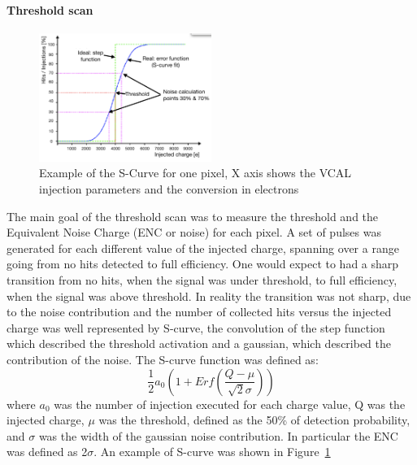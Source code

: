 \paragraph{Threshold scan}
\begin{figure}
        		\centering
                	\includegraphics[width=0.5\textwidth]{Images/ibl_stave_loading/ModuleReceptionTest/s_curve_other.tiff}
                	\caption{Example of the S-Curve for one pixel, X axis shows the VCAL injection parameters and the conversion in electrons}
                	\label{figure:SCurve}
\end{figure}
The main goal of the threshold scan was to measure the threshold and the Equivalent Noise Charge (ENC or noise) for each pixel.
A set of pulses was generated for each different value of the injected charge, spanning over a range going from no hits detected to full efficiency. 
One would expect to had a sharp transition from no hits, when the signal was under threshold, to full efficiency, when the signal was above threshold. In reality the transition was not sharp, due to the noise contribution and the number of collected hits versus the injected charge was well represented by S-curve, the convolution of the step function which described the threshold activation and a gaussian, which described the contribution of the noise.
The S-curve\cite{scurve} function was defined as:
\begin{equation}
\frac{1}{2}a_0(1+Erf(\frac{Q-\mu}{\sqrt{2}\sigma}))
\end{equation}
where $a_0$ was the number of injection executed for each charge value, Q was the injected charge, $\mu$ was the threshold, defined as the 50\% of detection probability, and $\sigma$ was the width of the gaussian noise contribution. In particular the ENC was defined as 2$\sigma$. 
 An example of S-curve was shown in Figure~\ref{figure:SCurve}\\
